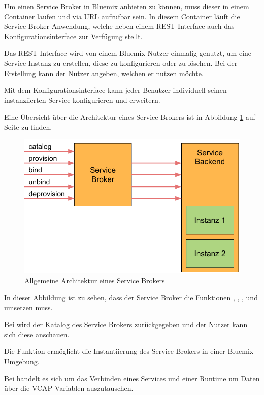 Um einen Service Broker in Bluemix anbieten zu können, muss dieser in einem Container laufen und via URL aufrufbar sein.
In diesem Container läuft die Service Broker Anwendung, welche neben einem REST-Interface auch das Konfigurationsinterface
zur Verfügung stellt.

Das REST-Interface wird von einem Bluemix-Nutzer einmalig genutzt, um eine Service-Instanz zu erstellen, diese zu
konfigurieren oder zu löschen. Bei der Erstellung kann der Nutzer angeben, welchen  er nutzen möchte.

Mit dem Konfigurationsinterface kann jeder Benutzer individuell seinen instanziierten Service konfigurieren und erweitern.

Eine Übersicht über die Architektur eines Service Brokers ist in Abbildung \ref{fig:architektur_servicebroker} auf Seite
\pageref{fig:architektur_servicebroker} zu finden.

\begin{figure}[h]
  \centering
    \includegraphics[scale=0.9]{images/kapitel_3/architektur_servicebroker.pdf}
  \caption{Allgemeine Architektur eines Service Brokers}
  \label{fig:architektur_servicebroker}
\end{figure}

In dieser Abbildung ist zu sehen, dass der Service Broker die Funktionen , , ,
 und  umsetzen muss.

Bei  wird der Katalog des Service Brokers zurückgegeben und der Nutzer kann sich diese anschauen.

Die Funktion  ermöglicht die Instantiierung des Service Brokers in einer Bluemix Umgebung.

Bei  handelt es sich um das Verbinden eines Services und einer Runtime um Daten über die VCAP-Variablen
auszutauschen.

